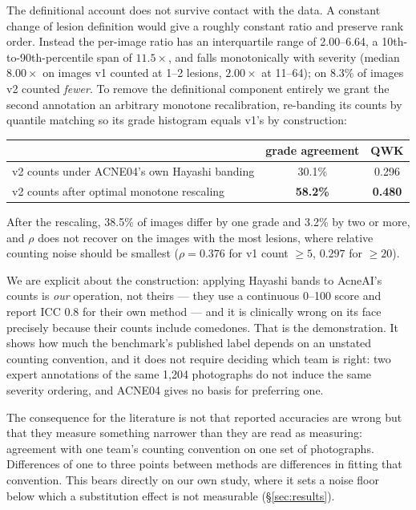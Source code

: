 \documentclass[11pt]{article}
\begin{document}
The definitional account does not survive contact with the data. A constant change of
lesion definition would give a roughly constant ratio and preserve rank order. Instead
the per-image ratio has an interquartile range of 2.00--6.64, a 10th-to-90th-percentile
span of $11.5\times$, and falls monotonically with severity (median $8.00\times$ on
images v1 counted at 1--2 lesions, $2.00\times$ at 11--64); on 8.3\% of images v2
counted \emph{fewer}. To remove the definitional component entirely we grant the second
annotation an arbitrary monotone recalibration, re-banding its counts by quantile
matching so its grade histogram equals v1's by construction:

\begin{center}
\begin{tabular}{lcc}
\toprule
& grade agreement & QWK \\
\midrule
v2 counts under ACNE04's own Hayashi banding & 30.1\% & 0.296 \\
v2 counts after optimal monotone rescaling & \textbf{58.2\%} & \textbf{0.480} \\
\bottomrule
\end{tabular}
\end{center}

After the rescaling, 38.5\% of images differ by one grade and 3.2\% by two or more, and
$\rho$ does not recover on the images with the most lesions, where relative counting
noise should be smallest ($\rho = 0.376$ for v1 count $\geq 5$, $0.297$ for
$\geq 20$).

We are explicit about the construction: applying Hayashi bands to AcneAI's counts is
\emph{our} operation, not theirs --- they use a continuous 0--100 score and report
ICC 0.8 for their own method --- and it is clinically wrong on its face precisely
because their counts include comedones. That is the demonstration. It shows how much
the benchmark's published label depends on an unstated counting convention, and it does
not require deciding which team is right: two expert annotations of the same 1{,}204
photographs do not induce the same severity ordering, and ACNE04 gives no basis for
preferring one.

The consequence for the literature is not that reported accuracies are wrong but that
they measure something narrower than they are read as measuring: agreement with one
team's counting convention on one set of photographs. Differences of one to three
points between methods are differences in fitting that convention. This bears directly
on our own study, where it sets a noise floor below which a substitution effect is not
measurable (\S\ref{sec:results}).
\end{document}
